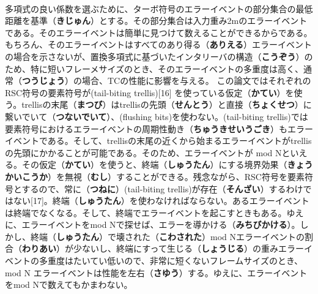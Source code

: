 \documentclass[24 pts]{article}
\begin{document}
\paragraph{}
多項式の良い係数を選ぶために、ターボ符号のエラーイベントの部分集合の最低距離を基準（\textbf{きじゅん}）とする。その部分集合は入力重み2mのエラーイベントである。そのエラーイベントは簡単に見つけて数えることができるからである。もちろん、そのエラーイベントはすべてのあり得る（\textbf{ありえる}）エラーイベントの場合を示さないが、置換多項式に基づいたインタリーバの構造（\textbf{こうぞう}）のため、特に短いフレーメサイズのとき、そのエラーイベントの多重度は高く、通常（\textbf{つうじょう}）の場合、TCの性能に影響を与える。
この論文ではそれぞれのRSC符号の要素符号が(tail-biting trellis)[16]
を使っている仮定（\textbf{かてい}）を使う。trellisの末尾（\textbf{まつび}）はtrellisの先頭（\textbf{せんとう}）と直接（\textbf{ちょくせつ}）に繋いでいて（\textbf{つないでいて}）、(flushing bits)を使わない。(tail-biting trellis)では要素符号におけるエラーイベントの周期性動き（\textbf{ちゅうきせいうごき}）もエラーイベントである。そして、trellisの末尾の近くから始まるエラーイベントがtrellisの先頭にかかることが可能である。そのため、エラーイベントが mod Nといえる。その仮定（\textbf{かてい}）を使うと、終端（\textbf{しゅうたん}）にする境界効果（\textbf{きょうかいこうか}）を無視（\textbf{むし}）することができる。残念ながら、RSC符号を要素符号とするので、常に（\textbf{つねに}）(tail-biting trellis)が存在（\textbf{そんざい}）するわけではない[17]。終端（\textbf{しゅうたん}）を使わなければならない。あるエラーイベントは終端でなくなる。そして、終端でエラーイベントを起こすときもある。ゆえに、エラーイベントをmod Nで探せば、エラーを導かける（\textbf{みちびかける}）。しかし、終端（\textbf{しゅうたん}）で壊された（\textbf{こわされた}）mod Nエラーイベントの割合（\textbf{わりあい}）が少ないし、終端にすって生じる（\textbf{しょうじる}）の重みエラーイベントの多重度はたいてい低いので、非常に短くないフレームサイズのとき、mod N エラーイベントは性能を左右（\textbf{さゆう}）する。ゆえに、エラーイベントをmod Nで数えてもかまわない。　
\end{document}
